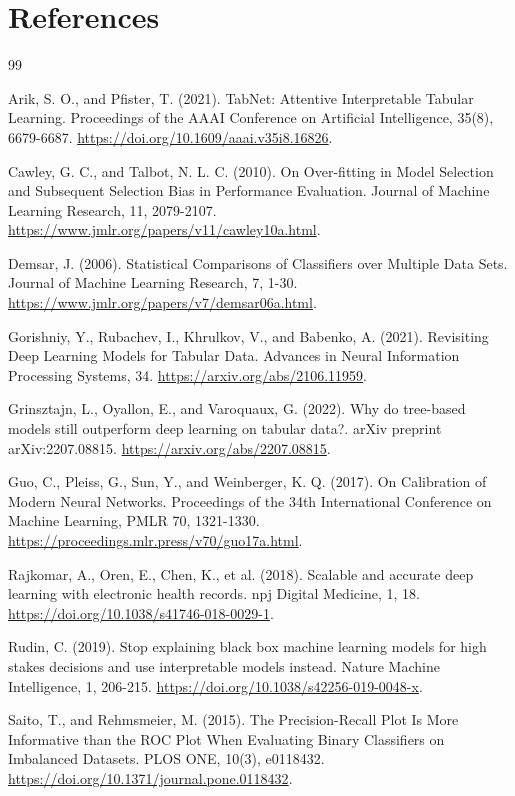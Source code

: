 \documentclass[10pt,twocolumn]{article}
\begin{document}
\section*{References}

\begin{thebibliography}{99}

 Arik, S. O., and Pfister, T. (2021). TabNet: Attentive Interpretable Tabular Learning. Proceedings of the AAAI Conference on Artificial Intelligence, 35(8), 6679-6687. \url{https://doi.org/10.1609/aaai.v35i8.16826}.

 Cawley, G. C., and Talbot, N. L. C. (2010). On Over-fitting in Model Selection and Subsequent Selection Bias in Performance Evaluation. Journal of Machine Learning Research, 11, 2079-2107. \url{https://www.jmlr.org/papers/v11/cawley10a.html}.

 Demsar, J. (2006). Statistical Comparisons of Classifiers over Multiple Data Sets. Journal of Machine Learning Research, 7, 1-30. \url{https://www.jmlr.org/papers/v7/demsar06a.html}.

 Gorishniy, Y., Rubachev, I., Khrulkov, V., and Babenko, A. (2021). Revisiting Deep Learning Models for Tabular Data. Advances in Neural Information Processing Systems, 34. \url{https://arxiv.org/abs/2106.11959}.

 Grinsztajn, L., Oyallon, E., and Varoquaux, G. (2022). Why do tree-based models still outperform deep learning on tabular data?. arXiv preprint arXiv:2207.08815. \url{https://arxiv.org/abs/2207.08815}.

 Guo, C., Pleiss, G., Sun, Y., and Weinberger, K. Q. (2017). On Calibration of Modern Neural Networks. Proceedings of the 34th International Conference on Machine Learning, PMLR 70, 1321-1330. \url{https://proceedings.mlr.press/v70/guo17a.html}.

 Rajkomar, A., Oren, E., Chen, K., et al. (2018). Scalable and accurate deep learning with electronic health records. npj Digital Medicine, 1, 18. \url{https://doi.org/10.1038/s41746-018-0029-1}.

 Rudin, C. (2019). Stop explaining black box machine learning models for high stakes decisions and use interpretable models instead. Nature Machine Intelligence, 1, 206-215. \url{https://doi.org/10.1038/s42256-019-0048-x}.

 Saito, T., and Rehmsmeier, M. (2015). The Precision-Recall Plot Is More Informative than the ROC Plot When Evaluating Binary Classifiers on Imbalanced Datasets. PLOS ONE, 10(3), e0118432. \url{https://doi.org/10.1371/journal.pone.0118432}.


\end{thebibliography}
\end{document}
